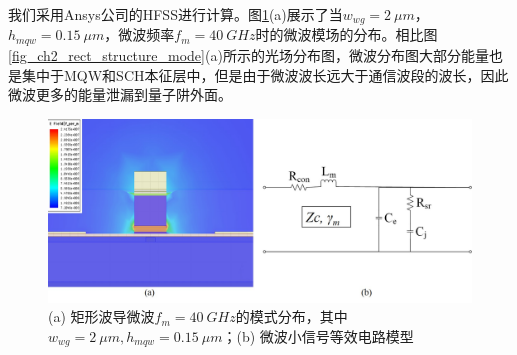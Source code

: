 我们采用Ansys公司的HFSS进行计算\cite{ansyshfss}。图\ref{fig_ch2_rect_microwave_mode_equal_circuits}(a)展示了当$w_{wg} =2~\mu m$，$h_{mqw} = 0.15~\mu m$，微波频率$f_m = 40~ GHz$时的微波模场的分布。相比图\ref{fig_ch2_rect_structure_mode}(a)所示的光场分布图，微波分布图大部分能量也是集中于MQW和SCH本征层中，但是由于微波波长远大于通信波段的波长，因此微波更多的能量泄漏到量子阱外面。
\begin{figure}[htb]
	\centering
	\includegraphics[width=12cm]{./Pictures/fig_ch2_rect_microwave_mode_equal_circuits.jpg}
	\caption{(a) 矩形波导微波$f_m = 40~GHz$的模式分布，其中$w_{wg} = 2~\mu m, h_{mqw} = 0.15~\mu m$；(b) 微波小信号等效电路模型}
	\label{fig_ch2_rect_microwave_mode_equal_circuits}
\end{figure}

